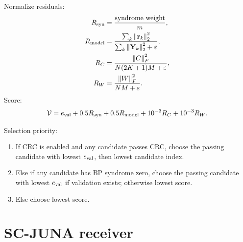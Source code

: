 \documentclass[11pt]{article}
\newcommand{\norm}[1]{\left\lVert #1 \right\rVert}
\newcommand{\eps}{\varepsilon}
\begin{document}
Normalize residuals:
\begin{align}
R_{\rm syn}&=\frac{\text{syndrome weight}}{m},\\
R_{\rm model}&=\frac{\sum_k\norm{\mathbf r_k}_2^2}{\sum_k\norm{\mathbf Y_k}_2^2+\eps},\\
R_C&=\frac{\norm C_F^2}{N(2K+1)M+\eps},\\
R_W&=\frac{\norm W_F^2}{NM+\eps}.
\end{align}
Score:
\begin{equation}
\mathcal V=e_{\rm val}+0.5R_{\rm syn}+0.5R_{\rm model}+10^{-3}R_C+10^{-3}R_W.
\end{equation}

Selection priority:
\begin{enumerate}
\item If CRC is enabled and any candidate passes CRC, choose the passing candidate with lowest $e_{\rm val}$, then lowest candidate index.
\item Else if any candidate has BP syndrome zero, choose the passing candidate with lowest $e_{\rm val}$ if validation exists; otherwise lowest score.
\item Else choose lowest score.
\end{enumerate}

\clearpage
\section{SC-JUNA receiver}
\end{document}
